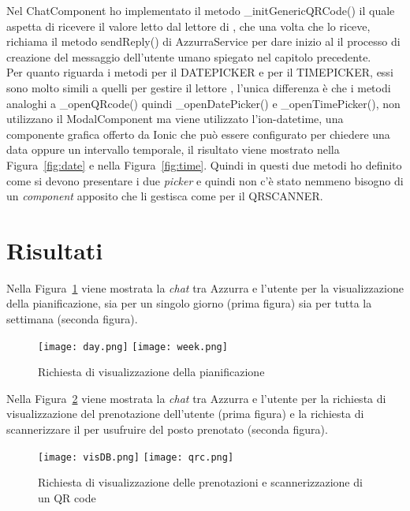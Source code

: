   Nel ChatComponent ho implementato il metodo \_initGenericQRCode() il quale aspetta di ricevere il valore letto dal lettore di , che una volta che lo riceve, richiama il metodo sendReply() di AzzurraService per dare inizio al il processo di creazione del messaggio dell'utente umano spiegato nel capitolo precedente. \\
  
  Per quanto riguarda i metodi per il DATEPICKER e per il TIMEPICKER, essi sono molto simili a quelli per gestire il lettore , l'unica differenza è che i metodi analoghi a \_openQRcode() quindi \_openDatePicker() e \_openTimePicker(), non utilizzano il ModalComponent ma viene utilizzato l'ion-datetime, una componente grafica offerto da Ionic che può essere configurato per chiedere una data oppure un intervallo temporale, il risultato viene mostrato nella Figura~\ref{fig:date} e nella Figura~\ref{fig:time}. Quindi in questi due metodi ho definito come si devono presentare i due \emph{picker} e quindi non c'è stato nemmeno bisogno di un \emph{component} apposito che li gestisca come per il QRSCANNER. 
\section{Risultati}

Nella Figura~\ref{fig:planning} viene mostrata la \emph{chat} tra Azzurra e l'utente per la visualizzazione della pianificazione, sia per un singolo giorno (prima figura) sia per tutta la settimana (seconda figura).\\

\begin{figure}[h]
	\begin{center}
		\texttt{[image: day.png]}\hfil
		\texttt{[image: week.png]}
		\caption{Richiesta di visualizzazione della pianificazione}\label{fig:planning}
	\end{center}
\end{figure}

Nella Figura~\ref{fig:QRc} viene mostrata la \emph{chat} tra Azzurra e l'utente per la richiesta di visualizzazione del prenotazione dell'utente (prima figura) e la richiesta di scannerizzare il  per usufruire del posto prenotato (seconda figura).\\

\begin{figure}[h]
	\begin{center}
		\texttt{[image: visDB.png]}\hfil
		\texttt{[image: qrc.png]}
		\caption{Richiesta di visualizzazione delle prenotazioni e scannerizzazione di un QR code}\label{fig:QRc}
	\end{center}
\end{figure}

